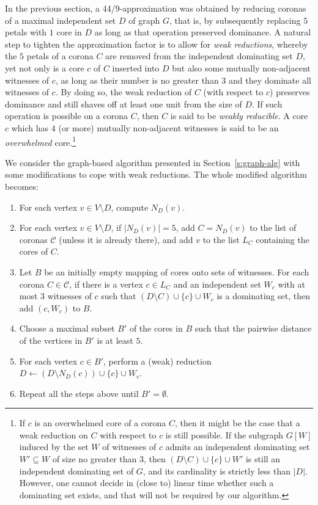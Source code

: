 \documentclass[preprint,12pt]{elsarticle}
\newcommand{\CC}{\mathcal{C}}
\begin{document}
In the previous section, a 44/9-approximation was obtained by reducing coronas of a maximal independent set $D$ of graph $G$, that is, by subsequently replacing $5$ petals with $1$ core in $D$ as long as that operation preserved dominance. A natural step to tighten the approximation factor is to allow for \emph{weak reductions}, whereby the $5$ petals of a corona $C$ are removed from the independent dominating set $D$, yet not only is a core $c$ of $C$ inserted into $D$ but also some mutually non-adjacent witnesses of $c$, as long as their number is no greater than $3$ and they dominate all witnesses of $c$. By doing so, the weak reduction of $C$ (with respect to $c$) preserves dominance and still shaves off at least one unit from the size of $D$. If such operation is possible on a corona $C$, then $C$ is said to be \emph{weakly reducible}.
A core $c$ which has $4$ (or more) mutually non-adjacent witnesses is said to be an \emph{overwhelmed} core.\footnote{If $c$ is an overwhelmed core of a corona $C$, then it might be the case that a weak reduction on $C$ with respect to $c$ is still possible. If the subgraph $G[W]$ induced by the set $W$ of witnesses of $c$ admits an independent dominating set $W' \subseteq W$ of size no greater than $3$, then $(D \setminus C) \cup \{c\} \cup W' $ is still an independent dominating set of $G$, and its cardinality is strictly less than $|D|$. However, one cannot decide in (close to) linear time whether such a dominating set exists, and that will not be required by our algorithm.}

We consider the graph-based algorithm presented in Section~\ref{s:graph-alg} with some modifications to cope with weak reductions. The whole modified algorithm becomes:

\begin{enumerate}[(1)]
\item For each vertex $v \in V \setminus D$, compute $N_D(v)$.

\item For each vertex $v \in V \setminus D$, if $|N_D(v)| = 5$, add $C = N_D(v)$ to the list of coronas $\CC$ (unless it is already there), and add $v$ to the list $L_C$ containing the cores of $C$.

\item Let $B$ be an initially empty mapping of cores onto sets of witnesses. For each corona $C \in \CC$, if there is a vertex $c \in L_C$ and an independent set $W_c$ with at most $3$ witnesses of $c$ such that $(D \setminus C) \cup \{c\} \cup W_c$ is a dominating set, then add $(c, W_c)$ to $B$. 

\item Choose a maximal subset $B'$ of the cores in $B$ such that the pairwise distance of the vertices in $B'$ is at least $5$.

\item For each vertex $c \in B'$, perform a (weak) reduction $D \gets (D \setminus N_D(c)) \cup \{c\} \cup W_c$.

\item Repeat all the steps above until $B' = \emptyset$.
\end{enumerate}
\end{document}
